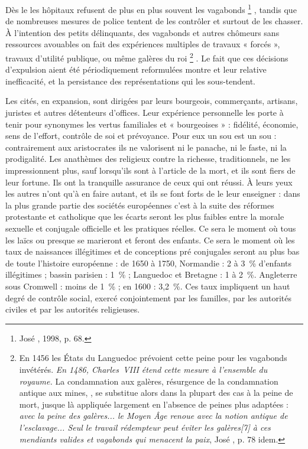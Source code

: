  Dès le  les hôpitaux refusent de plus en plus souvent les vagabonds%
\footnote{José , 1998, p. 68.}%
, tandis que de nombreuses mesures de police tentent de les contrôler et surtout de les chasser. À l'intention des petits délinquants, des vagabonds et autres chômeurs sans ressources avouables on fait des expériences multiples de travaux « forcés », travaux d'utilité publique, ou même galères du roi%
\footnote{En 1456 les États du Languedoc prévoient cette peine pour les vagabonds invétérés. \emph{En 1486, Charles~VIII étend cette mesure à l'ensemble du royaume.} La condamnation aux galères, résurgence de la condamnation antique aux mines, , se substitue alors dans la plupart des cas à la peine de mort, jusque là appliquée largement en l'absence de peines plus adaptées : \emph{avec la peine des galères... le Moyen Âge renoue avec la notion antique de l'esclavage... Seul le travail rédempteur peut éviter les galères[7] à ces mendiants valides et vagabonds qui menacent la paix}, José , p. 78 idem.}%
. Le fait que ces décisions d'expulsion aient été périodiquement reformulées montre et leur relative inefficacité, et la persistance des représentations qui les sous-tendent.

 Les cités, en expansion, sont dirigées par leurs bourgeois, commerçants, artisans, juristes et autres détenteurs d'offices. Leur expérience personnelle les porte à tenir pour synonymes les vertus familiales et « bourgeoises » : fidélité, économie, sens de l'effort, contrôle de soi et prévoyance. Pour eux un sou est un sou : contrairement aux aristocrates ils ne valorisent ni le panache, ni le faste, ni la prodigalité. Les anathèmes des religieux contre la richesse, traditionnels, ne les impressionnent plus, sauf lorsqu'ils sont à l'article de la mort, et ils sont fiers de leur fortune. Ils ont la tranquille assurance de ceux qui ont réussi. À leurs yeux les autres n'ont qu'à en faire autant, et ils se font forts de le leur enseigner : dans la plus grande partie des sociétés européennes c'est à la suite des réformes protestante et catholique que les écarts seront les plus faibles entre la morale sexuelle et conjugale officielle et les pratiques réelles. Ce sera le moment où tous les laïcs ou presque se marieront et feront des enfants. Ce sera le moment où les taux de naissances illégitimes et de conceptions pré conjugales seront au plus bas de toute l'histoire européenne : de 1650 à 1750, Normandie : 2 à 3~\% d'enfants illégitimes ; bassin parisien : 1~\% ; Languedoc et Bretagne : 1 à 2~\%. Angleterre sous Cromwell : moins de 1~\% ; en 1600 : 3,2~\%. Ces taux impliquent un haut degré de contrôle social, exercé conjointement par les familles, par les autorités civiles et par les autorités religieuses.

